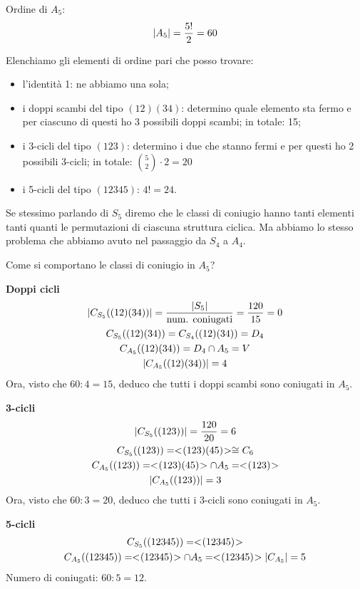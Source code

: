 \begin{dimostrazione}
	Ordine di $A_5$:
	\begin{equation*}
		\lvert A_5 \rvert = \dfrac{5!}{2} = 60
	\end{equation*}

	Elenchiamo gli elementi di ordine pari che posso trovare:
	\begin{itemize}
		\item l'identità 1: ne abbiamo una sola;
		\item i doppi scambi del tipo $(12)(34)$: determino quale elemento sta fermo e per ciascuno di questi ho 3
		possibili doppi scambi;
		in totale: 15;
		\item i 3-cicli del tipo $(123)$: determino i due che stanno fermi e per questi ho 2 possibili 3-cicli;
		in totale: $\binom{5}{2} \cdot 2 = 20$
		\item i 5-cicli del tipo $(12345)$: $4! = 24$.
	\end{itemize}

	Se stessimo parlando di $S_5$ diremo che le classi di coniugio hanno tanti elementi tanti quanti le permutazioni
	di ciascuna struttura ciclica.
	Ma abbiamo lo stesso problema che abbiamo avuto nel passaggio da $S_4$ a $A_4$.

	Come si comportano le classi di coniugio in $A_5$?

	\textbf{Doppi cicli}
	\begin{gather*}
		\lvert C_{S_5}((12)(34)) \rvert = \dfrac{\lvert S_5 \rvert}{\text{num. coniugati}} = \dfrac{120}{15} = 0 \\
		C_{S_5}((12)(34)) = C_{S_4}((12)(34)) = D_4 \\
		C_{A_5}((12)(34)) = D_4 \cap A_5 = V \\
		\lvert C_{A_5}((12)(34)) \rvert = 4
	\end{gather*}
	Ora, visto che $60 : 4 = 15$, deduco che tutti i doppi scambi sono coniugati in $A_5$.

	\textbf{3-cicli}
	\begin{gather*}
		\lvert C_{S_5}((123)) \rvert = \dfrac{120}{20} = 6 \\
		C_{S_5}((123)) = < \negmedspace (123)(45) \negmedspace > \cong C_6 \\
		C_{A_5}((123)) = < \negmedspace (123)(45) \negmedspace > \cap A_5 = < \negmedspace (123) \negmedspace > \\
		\lvert C_{A_5}((123)) \rvert = 3
	\end{gather*}
	Ora, visto che $60 : 3 = 20$, deduco che tutti i 3-cicli sono coniugati in $A_5$.

	\textbf{5-cicli}
	\begin{gather*}
		C_{S_5}((12345)) = < \negmedspace (12345) \negmedspace > \\
		C_{A_5}((12345)) = < \negmedspace (12345) \negmedspace > \cap A_5 = < \negmedspace (12345) \negmedspace >
		\lvert C_{A_5} \rvert = 5
	\end{gather*}
	Numero di coniugati: $60:5 = 12$.


\end{dimostrazione}

